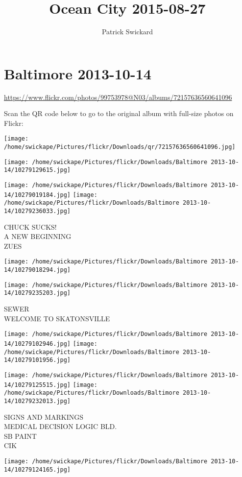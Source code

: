 \documentclass[10pt,letterpaper]{article}
\title{Ocean City 2015-08-27}
\author{Patrick Swickard}
\date{}
\begin{document}
\section*{Baltimore 2013-10-14}

\url{https://www.flickr.com/photos/99753978@N03/albums/72157636560641096}

Scan the QR code below to go to the original album with full-size photos on Flickr:

\texttt{[image: /home/swickape/Pictures/flickr/Downloads/qr/72157636560641096.jpg]}
\pagebreak

\texttt{[image: /home/swickape/Pictures/flickr/Downloads/Baltimore 2013-10-14/10279129615.jpg]}

\vspace{0.25in}
\texttt{[image: /home/swickape/Pictures/flickr/Downloads/Baltimore 2013-10-14/10279019184.jpg]}
\texttt{[image: /home/swickape/Pictures/flickr/Downloads/Baltimore 2013-10-14/10279236033.jpg]}

CHUCK SUCKS!\\
A NEW BEGINNING\\
ZUES
\pagebreak

\texttt{[image: /home/swickape/Pictures/flickr/Downloads/Baltimore 2013-10-14/10279018294.jpg]}

\vspace{0.25in}
\texttt{[image: /home/swickape/Pictures/flickr/Downloads/Baltimore 2013-10-14/10279235203.jpg]}

SEWER\\
WELCOME TO SKATONSVILLE
\pagebreak

\texttt{[image: /home/swickape/Pictures/flickr/Downloads/Baltimore 2013-10-14/10279102946.jpg]}
\texttt{[image: /home/swickape/Pictures/flickr/Downloads/Baltimore 2013-10-14/10279101956.jpg]}

\texttt{[image: /home/swickape/Pictures/flickr/Downloads/Baltimore 2013-10-14/10279125515.jpg]}
\texttt{[image: /home/swickape/Pictures/flickr/Downloads/Baltimore 2013-10-14/10279232013.jpg]}

SIGNS AND MARKINGS\\
MEDICAL DECISION LOGIC BLD.\\
SB PAINT\\
CIK
\pagebreak

\texttt{[image: /home/swickape/Pictures/flickr/Downloads/Baltimore 2013-10-14/10279124165.jpg]}
\end{document}
